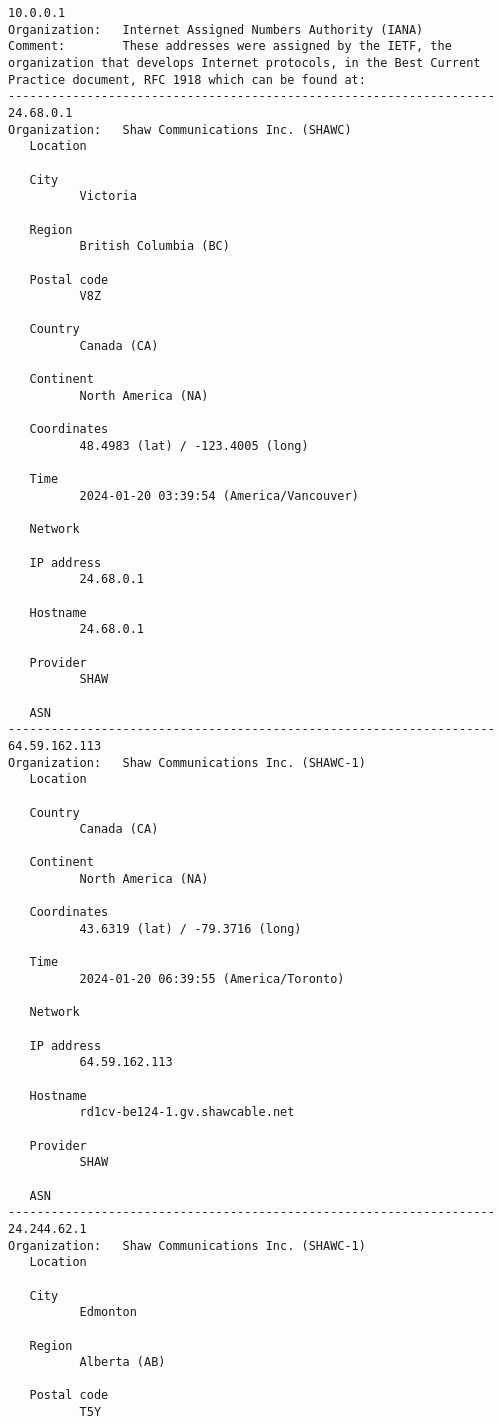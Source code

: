 \documentclass[
	letterpaper, %
	10pt, %
]{CSUniSchoolLabReport}
\begin{document}
\begin{center}
\begin{verbatim}
10.0.0.1
Organization:   Internet Assigned Numbers Authority (IANA)
Comment:        These addresses were assigned by the IETF, the organization that develops Internet protocols, in the Best Current Practice document, RFC 1918 which can be found at:
--------------------------------------------------------------------
24.68.0.1
Organization:   Shaw Communications Inc. (SHAWC)
   Location

   City
          Victoria

   Region
          British Columbia (BC)

   Postal code
          V8Z

   Country
          Canada (CA)

   Continent
          North America (NA)

   Coordinates
          48.4983 (lat) / -123.4005 (long)

   Time
          2024-01-20 03:39:54 (America/Vancouver)

   Network

   IP address
          24.68.0.1

   Hostname
          24.68.0.1

   Provider
          SHAW

   ASN
--------------------------------------------------------------------
64.59.162.113
Organization:   Shaw Communications Inc. (SHAWC-1)
   Location

   Country
          Canada (CA)

   Continent
          North America (NA)

   Coordinates
          43.6319 (lat) / -79.3716 (long)

   Time
          2024-01-20 06:39:55 (America/Toronto)

   Network

   IP address
          64.59.162.113

   Hostname
          rd1cv-be124-1.gv.shawcable.net

   Provider
          SHAW

   ASN
--------------------------------------------------------------------
24.244.62.1
Organization:   Shaw Communications Inc. (SHAWC-1)
   Location

   City
          Edmonton

   Region
          Alberta (AB)

   Postal code
          T5Y


\end{verbatim}
\end{center}
\end{document}
